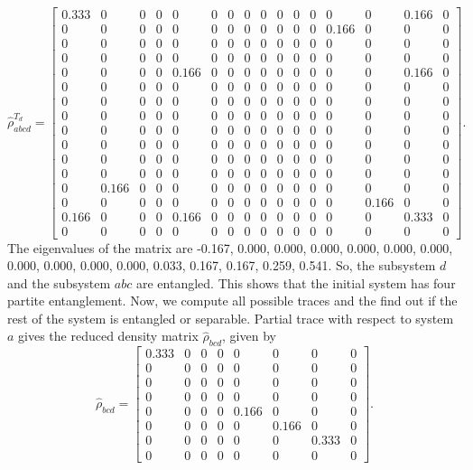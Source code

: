 \documentclass{amsart}
\theoremstyle{plain}
\theoremstyle{definition}
\theoremstyle{plain}
\begin{document}
\begin{equation*}
	\hat{\rho}^{T_d}_{abcd} = \left[\begin{array}{cccccccccccccccc}0.333 & 0 & 0 & 0 & 0 & 0 & 0 & 0 & 0 & 0 & 0 & 0 & 0 & 0 & 0.166 & 0\\0 & 0 & 0 & 0 & 0 & 0 & 0 & 0 & 0 & 0 & 0 & 0 & 0.166 & 0 & 0 & 0\\0 & 0 & 0 & 0 & 0 & 0 & 0 & 0 & 0 & 0 & 0 & 0 & 0 & 0 & 0 & 0\\0 & 0 & 0 & 0 & 0 & 0 & 0 & 0 & 0 & 0 & 0 & 0 & 0 & 0 & 0 & 0\\0 & 0 & 0 & 0 & 0.166 & 0 & 0 & 0 & 0 & 0 & 0 & 0 & 0 & 0 & 0.166 & 0\\0 & 0 & 0 & 0 & 0 & 0 & 0 & 0 & 0 & 0 & 0 & 0 & 0 & 0 & 0 & 0\\0 & 0 & 0 & 0 & 0 & 0 & 0 & 0 & 0 & 0 & 0 & 0 & 0 & 0 & 0 & 0\\0 & 0 & 0 & 0 & 0 & 0 & 0 & 0 & 0 & 0 & 0 & 0 & 0 & 0 & 0 & 0\\0 & 0 & 0 & 0 & 0 & 0 & 0 & 0 & 0 & 0 & 0 & 0 & 0 & 0 & 0 & 0\\0 & 0 & 0 & 0 & 0 & 0 & 0 & 0 & 0 & 0 & 0 & 0 & 0 & 0 & 0 & 0\\0 & 0 & 0 & 0 & 0 & 0 & 0 & 0 & 0 & 0 & 0 & 0 & 0 & 0 & 0 & 0\\0 & 0 & 0 & 0 & 0 & 0 & 0 & 0 & 0 & 0 & 0 & 0 & 0 & 0 & 0 & 0\\0 & 0.166 & 0 & 0 & 0 & 0 & 0 & 0 & 0 & 0 & 0 & 0 & 0 & 0 & 0 & 0\\0 & 0 & 0 & 0 & 0 & 0 & 0 & 0 & 0 & 0 & 0 & 0 & 0 & 0.166 & 0 & 0\\0.166 & 0 & 0 & 0 & 0.166 & 0 & 0 & 0 & 0 & 0 & 0 & 0 & 0 & 0 & 0.333 & 0\\0 & 0 & 0 & 0 & 0 & 0 & 0 & 0 & 0 & 0 & 0 & 0 & 0 & 0 & 0 & 0\end{array}\right]
	.
\end{equation*}
The eigenvalues of the matrix are -0.167, 0.000, 0.000, 0.000, 0.000, 0.000, 0.000, 0.000, 0.000, 0.000, 0.000, 0.033, 0.167, 0.167, 0.259, 0.541. So, the subsystem $d$ and the subsystem $abc$ are entangled. This shows that the initial system has four partite entanglement. Now, we compute all possible traces and the find out if the rest of the system is entangled or separable.
Partial trace with respect to system $a$ gives the reduced density matrix $\hat{\rho}_{bcd}$, given by 
\begin{equation*}
	\hat{\rho}_{bcd} = \left[\begin{matrix}0.333 & 0 & 0 & 0 & 0 & 0 & 0 & 0\\0 & 0 & 0 & 0 & 0 & 0 & 0 & 0\\0 & 0 & 0 & 0 & 0 & 0 & 0 & 0\\0 & 0 & 0 & 0 & 0 & 0 & 0 & 0\\0 & 0 & 0 & 0 & 0.166 & 0 & 0 & 0\\0 & 0 & 0 & 0 & 0 & 0.166 & 0 & 0\\0 & 0 & 0 & 0 & 0 & 0 & 0.333 & 0\\0 & 0 & 0 & 0 & 0 & 0 & 0 & 0\end{matrix}\right]
	.
\end{equation*}
\end{document}
